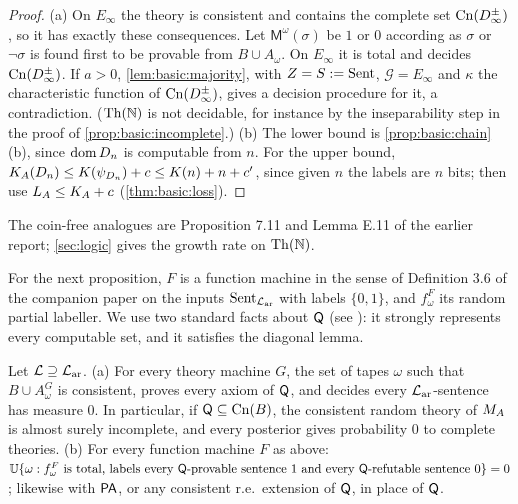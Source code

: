 \begin{proof}
(a) On $E_\infty$ the theory is consistent and contains the complete set $\mathrm{Cn}(D_\infty^\pm)$, so it has exactly these consequences. Let $\mathsf M^\omega(\sigma)$ be $1$ or $0$ according as $\sigma$ or $\neg\sigma$ is found first to be provable from $B\cup A_\omega$. On $E_\infty$ it is total and decides $\mathrm{Cn}(D_\infty^\pm)$. If $a>0$, \cref{lem:basic:majority}, with $Z=S:=\mathrm{Sent}$, $\mathcal G=E_\infty$ and $\kappa$ the characteristic function of $\mathrm{Cn}(D_\infty^\pm)$, gives a decision procedure for it, a contradiction. ($\mathrm{Th}(\mathbb N)$ is not decidable, for instance by the inseparability step in the proof of \cref{prop:basic:incomplete}.) (b) The lower bound is \cref{prop:basic:chain}(b), since $\operatorname{dom} D_n$ is computable from $n$. For the upper bound, $K_{A}(D_n)\le K(\psi_{D_n})+c\le K(n)+n+c'$, since given $n$ the labels are $n$ bits; then use $L_{A}\le K_{A}+c$ (\cref{thm:basic:loss}).
\end{proof}

The coin-free analogues are Proposition 7.11 and Lemma E.11 of the earlier report; \cref{sec:logic} gives the growth rate on $\mathrm{Th}(\mathbb N)$.

For the next proposition, $F$ is a function machine in the sense of Definition 3.6 of the companion paper on the inputs $\mathrm{Sent}_{\mathcal{L}_{\mathrm{ar}}}$ with labels $\{0,1\}$, and $f^F_\omega$ its random partial labeller. We use two standard facts about $\mathsf{Q}$ (see \citealp{boolos2007computability}): it strongly represents every computable set, and it satisfies the diagonal lemma.

\begin{proposition}\label{prop:basic:incomplete}
Let $\mathcal L\supseteq\mathcal{L}_{\mathrm{ar}}$.
(a) For every theory machine $G$, the set of tapes $\omega$ such that $B\cup A^G_\omega$ is consistent, proves every axiom of $\mathsf{Q}$, and decides every $\mathcal{L}_{\mathrm{ar}}$-sentence has measure $0$. In particular, if $\mathsf{Q}\subseteq\mathrm{Cn}(B)$, the consistent random theory of $M_{A}$ is almost surely incomplete, and every posterior gives probability $0$ to complete theories.
(b) For every function machine $F$ as above: $\mathbb{U}\{\omega:f^F_\omega\text{ is total, labels every }\mathsf{Q}\text{-provable sentence }1\text{ and every }\mathsf{Q}\text{-refutable sentence }0\}=0$; likewise with $\mathsf{PA}$, or any consistent r.e.\ extension of $\mathsf{Q}$, in place of $\mathsf{Q}$.
\end{proposition}

